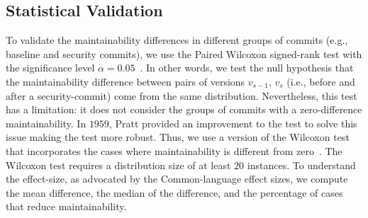 \documentclass[smallextended]{svjour3}       %
\begin{document}
%
%
%
%

\subsection{Statistical Validation}\label{sec:statsval}
%
To validate the maintainability differences in different groups of commits
(e.g., baseline and security commits), we use the Paired Wilcoxon signed-rank
test with the significance level $\alpha = 0.05$~\cite{10.2307/3001968}. In
other words, we test the null hypothesis that the maintainability difference
between pairs of versions $v_{s-1}$, $v_s$ (i.e., before and after a
security-commit) come from the same distribution. Nevertheless, this test 
has a limitation: it does not consider the groups of commits with a 
zero-difference maintainability. In $1959$, Pratt provided an improvement to 
the test to solve this issue making the test more robust. Thus, we use a 
version of the Wilcoxon test that incorporates the cases where 
maintainability is different from zero~\cite{10.2307/2282543}.
The Wilcoxon test requires a distribution size of at least $20$ instances.
To understand the effect-size, as advocated by the Common-language effect 
sizes\cite{graw:1992}, we compute the mean difference, the median of the 
difference, and the percentage of cases that reduce maintainability.
%
\end{document}
